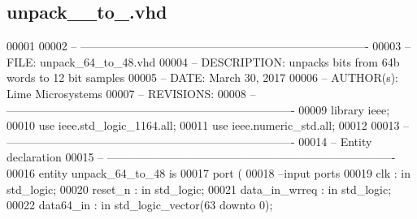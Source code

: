 \subsection{unpack\+\_\+\_\+to\+\_.\+vhd}
\label{unpack__64__to__48_8vhd_source}

\begin{DoxyCode}
00001 
00002 \textcolor{keyword}{-- ---------------------------------------------------------------------------- }
00003 \textcolor{keyword}{-- FILE:    unpack\_64\_to\_48.vhd}
00004 \textcolor{keyword}{-- DESCRIPTION: unpacks bits from 64b words to 12 bit samples}
00005 \textcolor{keyword}{-- DATE:    March 30, 2017}
00006 \textcolor{keyword}{-- AUTHOR(s):   Lime Microsystems}
00007 \textcolor{keyword}{-- REVISIONS:}
00008 \textcolor{keyword}{-- ---------------------------------------------------------------------------- }
00009 \textcolor{vhdlkeyword}{library }\textcolor{keywordflow}{ieee};
00010 \textcolor{vhdlkeyword}{use }ieee.std\_logic\_1164.\textcolor{keywordflow}{all};
00011 \textcolor{vhdlkeyword}{use }ieee.numeric\_std.\textcolor{keywordflow}{all};
00012 
00013 \textcolor{keyword}{-- ----------------------------------------------------------------------------}
00014 \textcolor{keyword}{-- Entity declaration}
00015 \textcolor{keyword}{-- ----------------------------------------------------------------------------}
00016 \textcolor{keywordflow}{entity }unpack_64_to_48 \textcolor{keywordflow}{is}
00017   \textcolor{keywordflow}{port} \textcolor{vhdlchar}{(}
00018 \textcolor{keyword}{      --input ports }
00019       \textcolor{vhdlchar}{clk}               \textcolor{vhdlchar}{:} \textcolor{keywordflow}{in} \textcolor{comment}{std\_logic};
00020       \textcolor{vhdlchar}{reset_n}           \textcolor{vhdlchar}{:} \textcolor{keywordflow}{in} \textcolor{comment}{std\_logic};
00021         \textcolor{vhdlchar}{data_in_wrreq}   \textcolor{vhdlchar}{:} \textcolor{keywordflow}{in} \textcolor{comment}{std\_logic};
00022         \textcolor{vhdlchar}{data64_in}       \textcolor{vhdlchar}{:} \textcolor{keywordflow}{in} \textcolor{comment}{std\_logic\_vector}\textcolor{vhdlchar}{(}\textcolor{vhdllogic}{}\textcolor{vhdllogic}{63} \textcolor{keywordflow}{downto} \textcolor{vhdllogic}{}\textcolor{vhdllogic}{0}\textcolor{vhdlchar}{)};

\end{DoxyCode}
